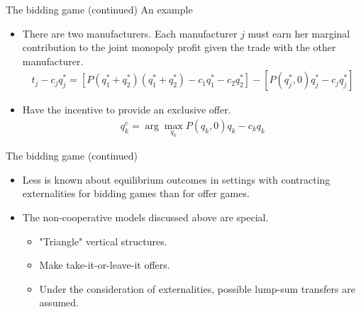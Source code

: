 \documentclass[aspectratio=169]{beamer}  %
\begin{document}
\begin{frame}{The bidding game (continued)}
    An example \vspace{.2cm}
    \begin{itemize}
        \item There are two manufacturers. Each manufacturer $j$ must earn her marginal contribution to the joint monopoly profit given the trade with the other manufacturer.
        \begin{align}
            t_j - c_j q_j^* = [ P(q_1^* + q_2^*)(q_1^* + q_2^*) - c_1 q_1^* - c_2 q_2^*] - [ P(q_j^*, 0)q_j^* - c_j q_j^*]
        \end{align}
        \item Have the incentive to provide an exclusive offer.
        \begin{align}
            q_k^e = \arg \max_{q_k} P(q_k, 0) q_k - c_k q_k
        \end{align}
    \end{itemize}
\end{frame}



\begin{frame}{The bidding game (continued)}
    \begin{itemize}
        \item Less is known about equilibrium outcomes in settings with contracting externalities for bidding games than for offer games. \vspace{.2cm}
        \item The non-cooperative models discussed above are special. \vspace{.2cm}
        \begin{itemize}
            \item "Triangle" vertical structures. \vspace{.2cm}
            \item Make take-it-or-leave-it offers. \vspace{.2cm}
            \item Under the consideration of externalities, possible lump-sum transfers are assumed. \vspace{.2cm}
        \end{itemize}
    \end{itemize}
\end{frame}



\end{document}
